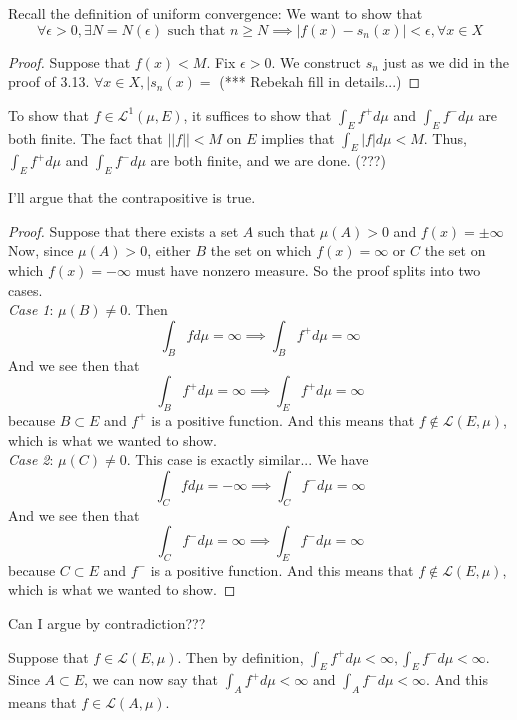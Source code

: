 \documentclass[12pt]{article}
\newenvironment{problem}[2][Problem]{\begin{trivlist}
\item[\hskip \labelsep {\bfseries #1}\hskip \labelsep {\bfseries #2.}]}{\end{trivlist}}
\theoremstyle{definition}
\theoremstyle{definition}
\theoremstyle{definition}
\theoremstyle{definition}
\begin{document}
\begin{problem}{3.14}
Recall the definition of uniform convergence: We want to show that 
$$ \forall \epsilon > 0, \exists N=N(\epsilon) \text{ such that } n \geq N \implies |f(x)-s_n(x)| < \epsilon, \forall x \in X$$
\begin{proof}
Suppose that $f(x) < M$. Fix $\epsilon > 0$. We construct $s_n$ just as we did in the proof of 3.13. $\forall x \in X, |s_n(x) = $ (*** Rebekah fill in details...)
\end{proof}
\end{problem}
\begin{problem}{4.13}
To show that $f \in \mathcal{L}^1(\mu, E)$, it suffices to show that $\int_Ef^+d\mu$ and $\int_Ef^-d\mu$ are both finite. The fact that $||f|| < M$ on $E$ implies that $\int_E|f|d\mu < M$. Thus, $\int_Ef^+d\mu$ and $\int_Ef^-d\mu$ are both finite, and we are done. (???)
\end{problem}
\begin{problem}{4.14}
I'll argue that the contrapositive is true.
\begin{proof}
Suppose that there exists a set $A$ such that $\mu(A)>0$ and $f(x) = \pm \infty$ Now, since $\mu(A) > 0$, either $B$ the set on which $f(x)=\infty$ or $C$ the set on which $f(x) =-\infty$ must have nonzero measure. So the proof splits into two cases. \\
\textit{Case 1}: $\mu(B) \neq 0$. Then 
$$\int_B fd\mu = \infty \implies \int_Bf^+d\mu = \infty $$ 
And we see then that 
$$\int_B f^+d\mu = \infty \implies \int_E f^+d\mu = \infty $$ 
because $B \subset E$ and $f^+$ is a positive function. And this means that $f \notin \mathcal{L}(E, \mu)$, which is what we wanted to show.\\
\textit{Case 2}: $\mu(C) \neq 0$. This case is exactly similar... We have
$$\int_C fd\mu = -\infty \implies \int_Cf^-d\mu = \infty $$ 
And we see then that 
$$\int_C f^-d\mu = \infty \implies \int_E f^-d\mu = \infty $$ 
because $C \subset E$ and $f^-$ is a positive function. And this means that $f \notin \mathcal{L}(E, \mu)$, which is what we wanted to show.
\end{proof}
\end{problem}

\begin{problem}{4.15}
Can I argue by contradiction???
\end{problem}

\begin{problem}{4.16}
Suppose that $f \in \mathcal{L}(E, \mu)$. Then by definition, $ \int_E f^+ d\mu < \infty, \int_E f^- d\mu < \infty$. Since $A \subset E$, we can now say that $\int_A f^+ d\mu < \infty$ and $\int_A f^- d\mu < \infty$. And this means that $f \in \mathcal{L}(A, \mu)$.
\end{problem}

\begin{problem}{4.21}
\end{problem}
\end{document}
